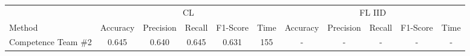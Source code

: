 \begin{table}[ht]
\begin{center}
\begin{adjustbox}{width=\textwidth}
\begin{tabular}{|l|*{5}{c}|*{5}{c}|}

\cline{1-11} & \multicolumn{5}{c|}{CL} & \multicolumn{5}{c|}{FL IID}       \\  \cline{2-11}
 Method & \multicolumn{1}{c|}{Accuracy} & \multicolumn{1}{c|}{Precision}& \multicolumn{1}{c|}{Recall}& \multicolumn{1}{c|}{F1-Score} & \multicolumn{1}{c|}{Time} & \multicolumn{1}{c|}{Accuracy} & \multicolumn{1}{c|}{Precision}& \multicolumn{1}{c|}{Recall}& \multicolumn{1}{c|}{F1-Score} & \multicolumn{1}{c|}{Time} \\ 
 \hline \hline
\multicolumn{1}{|l|}{Competence Team \#2 \cite{second_team}} & 0.645 & 0.640 & 0.645& 0.631 & 155 & - & - & - & - & - \\


\end{tabular}
\end{adjustbox}
\end{center}
\end{table}
